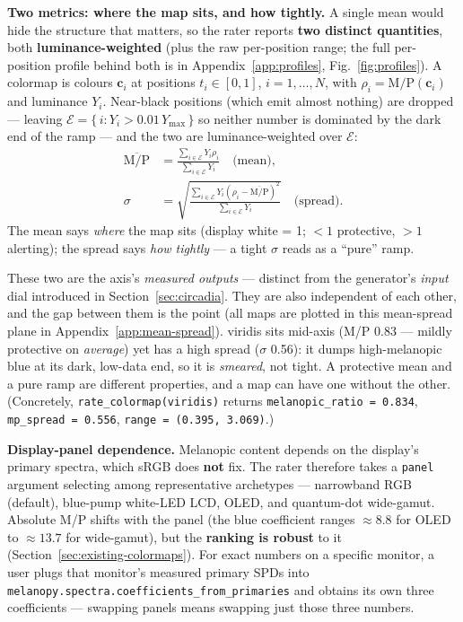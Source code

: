 \documentclass[10pt,a4paper,twocolumn]{article}
\begin{document}
\par
\textbf{Two metrics: where the map sits, and how tightly.}
A single mean would hide the structure that matters, so the rater reports \textbf{two distinct quantities}, both \textbf{luminance-weighted} (plus the raw per-position range; the full per-position profile behind both is in Appendix~\ref{app:profiles}, Fig.~\ref{fig:profiles}).
A colormap is colours $\mathbf{c}_i$ at positions $t_i\in[0,1]$, $i=1,\dots,N$, with $\rho_i=\mathrm{M/P}(\mathbf{c}_i)$ and luminance $Y_i$.
Near-black positions (which emit almost nothing) are dropped --- leaving $\mathcal{E}=\{\,i : Y_i > 0.01\,Y_{\max}\,\}$ so neither number is dominated by the dark end of the ramp --- and the two are luminance-weighted over $\mathcal{E}$:
\begin{align}
  \overline{\mathrm{M/P}}
    &= \frac{\sum_{i\in\mathcal E} Y_i\rho_i}{\sum_{i\in\mathcal E} Y_i}
       \quad\text{(mean)}, \label{eq:mean}\\
  \sigma
    &= \sqrt{\frac{\sum_{i\in\mathcal E} Y_i(\rho_i-\overline{\mathrm{M/P}})^2}%
                  {\sum_{i\in\mathcal E} Y_i}}
       \quad\text{(spread)}. \label{eq:spread}
\end{align}
The mean says \emph{where} the map sits (display white = 1; $<1$ protective, $>1$ alerting); the spread says \emph{how tightly} --- a tight $\sigma$ reads as a ``pure'' ramp.

These two are the axis's \emph{measured outputs} --- distinct from the generator's \emph{input} dial introduced in Section~\ref{sec:circadia}.
They are also independent of each other, and the gap between them is the point (all maps are plotted in this mean-spread plane in Appendix~\ref{app:mean-spread}).
viridis sits mid-axis (M/P 0.83 --- mildly protective on \emph{average}) yet has a high spread ($\sigma$ 0.56): it dumps high-melanopic blue at its dark, low-data end, so it is \emph{smeared}, not tight.
A protective mean and a pure ramp are different properties, and a map can have one without the other.
(Concretely, \texttt{rate\_colormap(viridis)} returns \texttt{melanopic\_ratio = 0.834}, \texttt{mp\_spread = 0.556}, \texttt{range = (0.395, 3.069)}.) %

\par
\textbf{Display-panel dependence.}
Melanopic content depends on the display's primary spectra, which sRGB does \textbf{not} fix.
The rater therefore takes a \texttt{panel} argument selecting among representative archetypes --- narrowband RGB (default), blue-pump white-LED LCD, OLED, and quantum-dot wide-gamut.
Absolute M/P shifts with the panel (the blue coefficient ranges $\approx 8.8$ for OLED to $\approx 13.7$ for wide-gamut), but the \textbf{ranking is robust} to it (Section~\ref{sec:existing-colormaps}).
For exact numbers on a specific monitor, a user plugs that monitor's measured primary SPDs into \texttt{melanopy.spectra.coefficients\_from\_primaries} and obtains its own three coefficients --- swapping panels means swapping just those three numbers.
\end{document}
